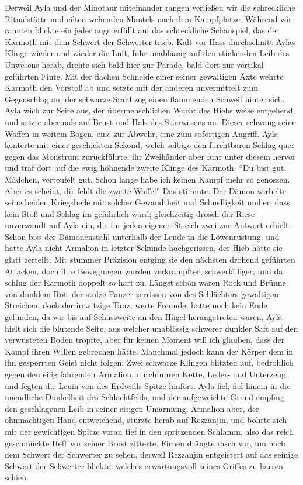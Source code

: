 Derweil Ayla und der Minotaur miteinander rangen verließen wir die schreckliche Ritualstätte und eilten wehenden Mantels nach dem Kampfplatze. Während wir rannten blickte ein jeder angsterfüllt auf das schreckliche Schauspiel, das der Karmoth mit dem Schwert der Schwerter trieb. Kalt vor Hass durchschnitt Aylas Klinge wieder und wieder die Luft, fuhr unablässig auf den stinkenden Leib des Unwesens herab, drehte sich bald hier zur Parade, bald dort zur vertikal geführten Finte. Mit der flachen Schneide einer seiner gewaltigen Äxte wehrte Karmoth den Vorstoß ab und setzte mit der anderen unvermittelt zum Gegenschlag an; der schwarze Stahl zog einen flammenden Schweif hinter sich. Ayla wich zur Seite aus, der übermenschlichen Wucht des Hiebs weise entgehend, und setzte abermals auf Brust und Hals des Stierwesens an. Dieser schwang seine Waffen in weitem Bogen, eine zur Abwehr, eine zum sofortigen Angriff. Ayla konterte mit einer geschickten Sekond, welch selbige den furchtbaren Schlag quer gegen das Monstrum zurückführte, ihr Zweihänder aber fuhr unter diesem hervor und traf dort auf die ewig höhnende zweite Klinge des Karmoth. ``Du bist gut, Mädchen, verteufelt gut. Schon lange habe ich keinen Kampf mehr so genossen. Aber es scheint, dir fehlt die zweite Waffe!'' Das stimmte. Der Dämon wirbelte seine beiden Kriegsbeile mit solcher Gewandtheit und Schnelligkeit umher, dass kein Stoß und Schlag im gefährlich ward; gleichzeitig drosch der Riese unverwandt auf Ayla ein, die für jeden eigenen Streich zwei zur Antwort erhielt. Schon biss der Dämonenstahl unterhalb der Lende in die Löwenrüstung, und hätte Ayla nicht Armalion in letzter Sekunde hochgerissen, der Hieb hätte sie glatt zerteilt. Mit stummer Präzision entging sie den nächsten drohend geführten Attacken, doch ihre Bewegungen wurden verkrampfter, schwerfälliger, und da schlug der Karmoth doppelt so hart zu. Längst schon waren Rock und Brünne von dunklem Rot, der stolze Panzer zerrissen von des Schlächters gewaltigen Streichen, doch der irrwitzige Tanz, werte Freunde, hatte noch kein Ende gefunden, da wir bis auf Schussweite an den Hügel herangetreten waren. Ayla hielt sich die blutende Seite, aus welcher unablässig schwerer dunkler Saft auf den verwüsteten Boden tropfte, aber für keinen Moment will ich glauben, dass der Kampf ihren Willen gebrochen hätte. Manchmal jedoch kann der Körper dem in ihn gesperrten Geist nicht folgen: Zwei schwarze Klingen blitzten auf, bedrohlich gegen den eilig fahrenden Armalion, durchfuhren Kette, Leder- und Unterzeug, und fegten die Leuin von des Erdwalls Spitze hinfort. Ayla fiel, fiel hinein in die unendliche Dunkelheit des Schlachtfelds, und der aufgeweichte Grund empfing den geschlagenen Leib in seiner eisigen Umarmung. Armalion aber, der ohnmächtigen Hand entweichend, stürzte herab auf Rezzanjin, und bohrte sich mit der gewichtigen Spitze voran tief in den spritzenden Schlamm, also das reich geschmückte Heft vor seiner Brust zitterte. Firnen drängte rasch vor, um nach dem Schwert der Schwerter zu sehen, derweil Rezzanjin entgeistert auf das seinige Schwert der Schwerter blickte, welches erwartungsvoll seines Griffes zu harren schien.

